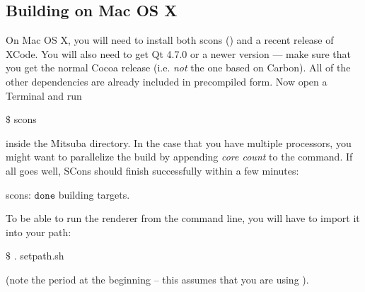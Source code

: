 \subsection{Building on Mac OS X}
On Mac OS X, you will need to install both scons () and 
a recent release of XCode. You will also need to get Qt 4.7.0 or a newer version
--- make sure that you get the normal Cocoa release (i.e. \emph{not} the one based on Carbon). All of the
other dependencies are already included in precompiled form.
Now open a Terminal and run
\begin{shell}
$\text{\$}$ scons
\end{shell}
inside the Mitsuba directory. In the case that you have multiple processors, you might want to parallelize the build by appending \emph{core count} to the command.
If all goes well, SCons should finish successfully within a few minutes:
\begin{shell}
scons: $\texttt{done}$ building targets.
\end{shell}
To be able to run the renderer from the command line, you will have to import it into your path:
\begin{shell}
$\text{\$}$ . setpath.sh
\end{shell}
(note the period at the beginning -- this assumes that you are using ).
